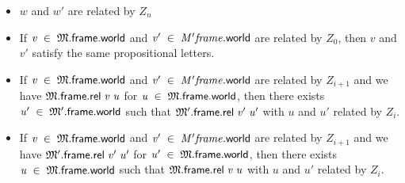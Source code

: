 \documentclass[letterpaper]{article}
\renewcommand{\HOLinline}[1]{\ensuremath{#1}}
\begin{document}
\begin{itemize}
  \item $w$ and $w'$ are related by $Z_n$
  \item If \HOLinline{\HOLFreeVar{v}\;\HOLSymConst{\HOLTokenIn{}}\;\HOLFreeVar{\ensuremath{\mathfrak{M}}}.\HOLFieldName{frame}.\HOLFieldName{world}} and \HOLinline{\HOLFreeVar{v\sp{\prime}}\;\HOLSymConst{\HOLTokenIn{}}\;\HOLFreeVar{M'frame}.\HOLFieldName{world}} are related by $Z_0$, then $v$ and $v'$ satisfy the same propositional letters.
  \item If \HOLinline{\HOLFreeVar{v}\;\HOLSymConst{\HOLTokenIn{}}\;\HOLFreeVar{\ensuremath{\mathfrak{M}}}.\HOLFieldName{frame}.\HOLFieldName{world}} and \HOLinline{\HOLFreeVar{v\sp{\prime}}\;\HOLSymConst{\HOLTokenIn{}}\;\HOLFreeVar{M'frame}.\HOLFieldName{world}} are related by $Z_{i+1}$ and we have \HOLinline{\HOLFreeVar{\ensuremath{\mathfrak{M}}}.\HOLFieldName{frame}.\HOLFieldName{rel}\;\HOLFreeVar{v}\;\HOLFreeVar{u}} for \HOLinline{\HOLFreeVar{u}\;\HOLSymConst{\HOLTokenIn{}}\;\HOLFreeVar{\ensuremath{\mathfrak{M}}}.\HOLFieldName{frame}.\HOLFieldName{world}}, then there exists \HOLinline{\HOLFreeVar{u\sp{\prime}}\;\HOLSymConst{\HOLTokenIn{}}\;\HOLFreeVar{\ensuremath{\mathfrak{M}'}}.\HOLFieldName{frame}.\HOLFieldName{world}} such that \HOLinline{\HOLFreeVar{\ensuremath{\mathfrak{M}'}}.\HOLFieldName{frame}.\HOLFieldName{rel}\;\HOLFreeVar{v\sp{\prime}}\;\HOLFreeVar{u\sp{\prime}}} with $u$ and $u'$ related by $Z_i$.
  \item If \HOLinline{\HOLFreeVar{v}\;\HOLSymConst{\HOLTokenIn{}}\;\HOLFreeVar{\ensuremath{\mathfrak{M}}}.\HOLFieldName{frame}.\HOLFieldName{world}} and \HOLinline{\HOLFreeVar{v\sp{\prime}}\;\HOLSymConst{\HOLTokenIn{}}\;\HOLFreeVar{M'frame}.\HOLFieldName{world}} are related by $Z_{i+1}$ and we have \HOLinline{\HOLFreeVar{\ensuremath{\mathfrak{M}'}}.\HOLFieldName{frame}.\HOLFieldName{rel}\;\HOLFreeVar{v\sp{\prime}}\;\HOLFreeVar{u\sp{\prime}}} for \HOLinline{\HOLFreeVar{u\sp{\prime}}\;\HOLSymConst{\HOLTokenIn{}}\;\HOLFreeVar{\ensuremath{\mathfrak{M}}}.\HOLFieldName{frame}.\HOLFieldName{world}}, then there exists \HOLinline{\HOLFreeVar{u}\;\HOLSymConst{\HOLTokenIn{}}\;\HOLFreeVar{\ensuremath{\mathfrak{M}}}.\HOLFieldName{frame}.\HOLFieldName{world}} such that \HOLinline{\HOLFreeVar{\ensuremath{\mathfrak{M}}}.\HOLFieldName{frame}.\HOLFieldName{rel}\;\HOLFreeVar{v}\;\HOLFreeVar{u}} with $u$ and $u'$ related by $Z_i$.
\end{itemize}
\end{document}

